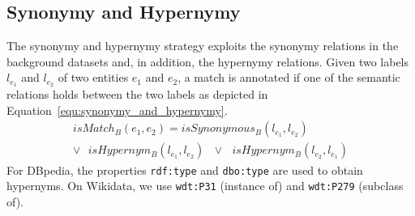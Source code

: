 \documentclass[runningheads]{llncs}
\begin{document}
\subsection{Synonymy and Hypernymy}
\label{ssec:synonymy_hypernymy_strategy}
The synonymy and hypernymy strategy exploits the synonymy relations in the background datasets and, in addition, the hypernymy relations. Given two labels $l_{e_1}$ and $l_{e_2}$ of two entities $e_1$ and $e_2$, a match is annotated if one of the semantic relations holds between the two labels as depicted in Equation~\ref{equ:synonymy_and_hypernymy}.
\begin{equation}
\begin{split}
isMatch_B(e_1, e_2) = isSynonymous_B(l_{e_1}, l_{e_2})
\textrm{ }\\ \lor \textrm{ }isHypernym_B(l_{e_1}, l_{e_2})\textrm{ } \lor \textrm{ }isHypernym_B(l_{e_2}, l_{e_1})
\end{split}
\label{equ:synonymy_and_hypernymy}
\end{equation}
For DBpedia, the properties \texttt{rdf:type} and \texttt{dbo:type} are used to obtain hypernyms. On Wikidata, we use \texttt{wdt:P31} (instance of) and \texttt{wdt:P279} (subclass of).
\end{document}
